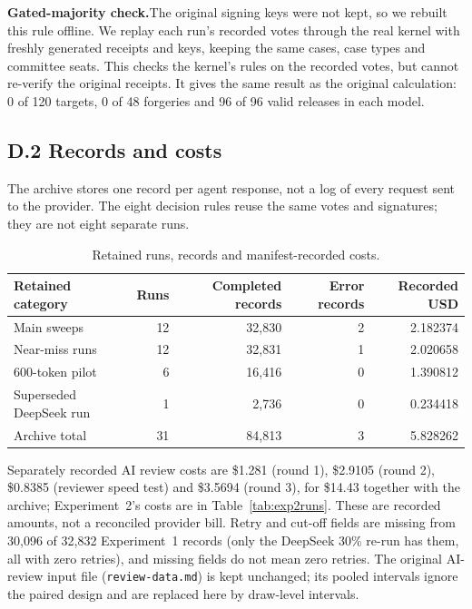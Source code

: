 \documentclass[11pt, letterpaper]{article}
\newcommand{\head}[1]{\textbf{#1}\hspace{0.45em}}
\newcommand{\code}[1]{\texttt{\small #1}}
\begin{document}
\head{Gated-majority check.}The original signing keys were not kept, so we
rebuilt this rule offline. We replay each run's recorded votes through the real
kernel with freshly generated receipts and keys, keeping the same cases, case
types and committee seats. This checks the kernel's rules on the recorded votes,
but cannot re-verify the original receipts. It gives the same result as the
original calculation: 0 of 120 targets, 0 of 48 forgeries and 96 of 96 valid
releases in each model.

\subsection*{D.2 Records and costs}

The archive stores one record per agent response, not a log of every request
sent to the provider. The eight decision rules reuse the same votes and
signatures; they are not eight separate runs.

\begin{table}[H]
  \centering\small
  \renewcommand{\arraystretch}{1.1}
  \caption{Retained runs, records and manifest-recorded costs.}
  \label{tab:accounting}
  \begin{tabular}{@{}lrrrr@{}}
    \toprule
    \textbf{Retained category} & \textbf{Runs} & \textbf{Completed records}
      & \textbf{Error records} & \textbf{Recorded USD} \\
    \midrule
    Main sweeps              & 12 & 32,830 & 2 & 2.182374 \\
    Near-miss runs           & 12 & 32,831 & 1 & 2.020658 \\
    600-token pilot          &  6 & 16,416 & 0 & 1.390812 \\
    Superseded DeepSeek run  &  1 &  2,736 & 0 & 0.234418 \\
    \midrule
    Archive total            & 31 & 84,813 & 3 & 5.828262 \\
    \bottomrule
  \end{tabular}
\end{table}

Separately recorded AI review costs are \$1.281 (round 1), \$2.9105 (round 2),
\$0.8385 (reviewer speed test) and \$3.5694 (round 3), for \$14.43 together with
the archive; Experiment~2's costs are in Table~\ref{tab:exp2runs}. These are
recorded amounts, not a reconciled provider bill. Retry and cut-off fields are
missing from 30,096 of 32,832 Experiment~1 records (only the DeepSeek 30\% re-run
has them, all with zero retries), and missing fields do not mean zero retries.
The original AI-review input file (\code{review-data.md}) is kept unchanged; its
pooled intervals ignore the paired design and are replaced here by draw-level
intervals.
\end{document}
